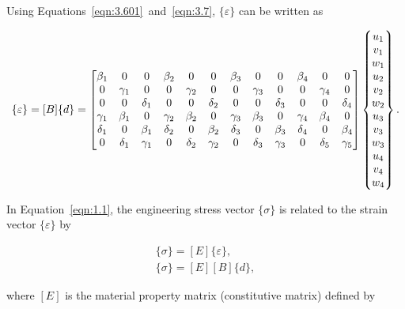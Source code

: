 \noindent Using Equations~\ref{eqn:3.601}~and~\ref{eqn:3.7}, $\{\varepsilon\} $ can be written as

\begin{equation}
\{\varepsilon\} = [B]\{d\}
 =
\setcounter{MaxMatrixCols}{20}
\begin{bmatrix}
    \beta_{1} & 0 & 0 & \beta_{2} & 0 & 0 &\beta_{3} & 0 & 0 & \beta_{4} & 0 & 0 \\
    0 & \gamma_{1} & 0 & 0 & \gamma_{2} & 0 & 0 & \gamma_{3} & 0 & 0 & \gamma_{4} & 0 \\
    0  & 0  & \delta_{1} & 0  & 0  & \delta_{2} & 0  & 0  & \delta_{3} & 0  & 0  & \delta_{4} \\
    \gamma_{1} & \beta_{1} & 0 & \gamma_{2} & \beta_{2} & 0 & \gamma_{3} & \beta_{3} & 0 & \gamma_{4} & \beta_{4} & 0 \\
    \delta_{1} & 0 & \beta_{1} & \delta_{2} & 0 & \beta_{2} & \delta_{3} & 0 & \beta_{3} & \delta_{4} & 0 & \beta_{4}   \\
    0 &  \delta_{1} & \gamma_{1} & 0 &  \delta_{2} & \gamma_{2} & 0 &  \delta_{3} & \gamma_{3} & 0 &  \delta_{5} & \gamma_{5}
 \end{bmatrix}
 \begin{Bmatrix} u_{1} \\ v_{1} \\ w_{1} \\ u_{2} \\ v_{2} \\ w_{2} \\ u_{3} \\ v_{3} \\ w_{3}\\ u_{4} \\ v_{4} \\ w_{4} \end{Bmatrix}.
 \label{eqn:3.71}
\end{equation}

\noindent In Equation~\ref{eqn:1.1}, the engineering stress vector $\{ \sigma \}$ is related to the strain vector $\{ \varepsilon \}$ by

\begin{equation}
\begin{array}{l}
\{\sigma\} = [E]\{\varepsilon\}, \\
\{\sigma\} = [E][B]\{d\},
\label{eqn:3.8}
\end{array}
\end{equation}

\noindent where $[E]$ is the material property matrix (constitutive matrix) defined by

